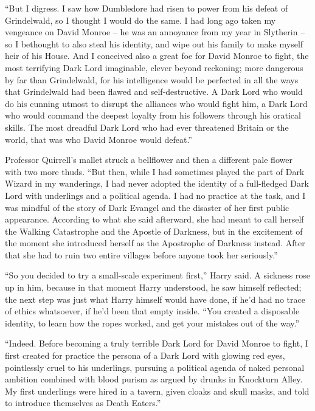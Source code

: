 “But I digress. I saw how Dumbledore had risen to power from his defeat of Grindelwald, so I thought I would do the same. I had long ago taken my vengeance on David Monroe – he was an annoyance from my year in Slytherin – so I bethought to also steal his identity, and wipe out his family to make myself heir of his House. And I conceived also a great foe for David Monroe to fight, the most terrifying Dark Lord imaginable, clever beyond reckoning; more dangerous by far than Grindelwald, for his intelligence would be perfected in all the ways that Grindelwald had been flawed and self-destructive. A Dark Lord who would do his cunning utmost to disrupt the alliances who would fight him, a Dark Lord who would command the deepest loyalty from his followers through his oratical skills. The most dreadful Dark Lord who had ever threatened Britain or the world, that was who David Monroe would defeat.”

Professor Quirrell’s mallet struck a bellflower and then a different pale flower with two more thuds. “But then, while I had sometimes played the part of Dark Wizard in my wanderings, I had never adopted the identity of a full-fledged Dark Lord with underlings and a political agenda. I had no practice at the task, and I was mindful of the story of Dark Evangel and the disaster of her first public appearance. According to what she said afterward, she had meant to call herself the Walking Catastrophe and the Apostle of Darkness, but in the excitement of the moment she introduced herself as the Apostrophe of Darkness instead. After that she had to ruin two entire villages before anyone took her seriously.”

“So you decided to try a small-scale experiment first,” Harry said. A sickness rose up in him, because in that moment Harry understood, he saw himself reflected; the next step was just what Harry himself would have done, if he’d had no trace of ethics whatsoever, if he’d been that empty inside. “You created a disposable identity, to learn how the ropes worked, and get your mistakes out of the way.”

“Indeed. Before becoming a truly terrible Dark Lord for David Monroe to fight, I first created for practice the persona of a Dark Lord with glowing red eyes, pointlessly cruel to his underlings, pursuing a political agenda of naked personal ambition combined with blood purism as argued by drunks in Knockturn Alley. My first underlings were hired in a tavern, given cloaks and skull masks, and told to introduce themselves as Death Eaters.”

